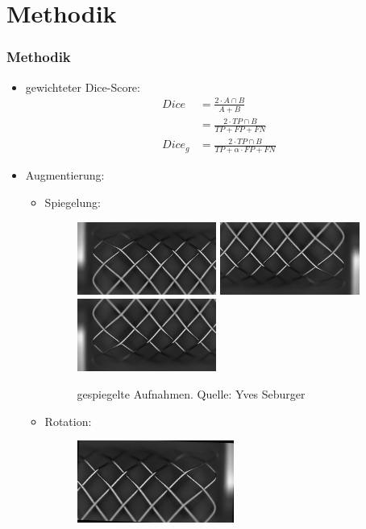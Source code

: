 \documentclass{beamer}
\begin{document}
\section{Methodik}
\begin{frame}[allowframebreaks]
\frametitle{Methodik}
\begin{itemize}
    \item gewichteter Dice-Score:
    \begin{equation}
        \begin{split}
            Dice &= \frac{2 \cdot A \cap B}{A + B}\\
            &= \frac{2 \cdot TP \cap B}{TP + FP + FN}\\
            Dice_g &= \frac{2 \cdot TP \cap B}{TP + \alpha \cdot FP + FN}
        \end{split}
    \end{equation}
    \newpage
    \item Augmentierung:
    \begin{itemize}
        \item Spiegelung:
        \begin{figure}
            \includegraphics[height=2.4cm]{Bilder/Augmentation/mlr.jpg}
            \includegraphics[height=2.4cm]{Bilder/Augmentation/mtb.jpg}
            \includegraphics[height=2.4cm]{Bilder/Augmentation/mtlr.jpg}
            \caption{gespiegelte Aufnahmen. Quelle: Yves Seburger}
        \end{figure} 
        \item Rotation:
        \begin{figure}
            \includegraphics[height=2.7cm]{Bilder/Augmentation/-2grad.jpg}

\end{figure}
\end{itemize}
\end{itemize}
\end{frame}
\end{document}

